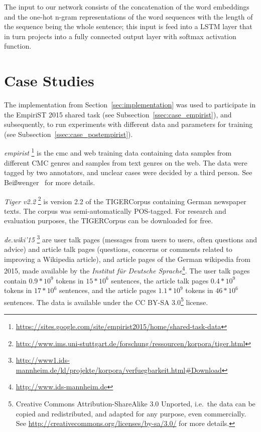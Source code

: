 \documentclass[11pt]{article}
\begin{document}
The input to our network consists of the concatenation of the word embeddings and the one-hot n-gram representations of the word sequences with the length of the sequence being the whole sentence; this input is feed into a LSTM layer that in turn projects into a fully connected output layer with softmax activation function. 

\section{Case Studies}
\label{sec:casestudies}

The implementation from Section~\ref{sec:implementation} was used to participate in the EmpiriST 2015 shared task (see Subsection~\ref{ssec:case_empirist}), and subsequently, to run experiments with different data and parameters for training (see Subsection~\ref{ssec:case_postempirist}).

\emph{empirist}%
\footnote{\url{https://sites.google.com/site/empirist2015/home/shared-task-data}}
is the cmc and web training data containing data samples from different CMC genres and samples from text genres on the web.
The data were tagged by two annotators, and unclear cases were decided by a third person. See Bei{\ss}wenger~ for more details.

\emph{Tiger v2.2}%
\footnote{\url{http://www.ims.uni-stuttgart.de/forschung/ressourcen/korpora/tiger.html}}
is version 2.2 of the TIGERCorpus\cite{Brants2004} containing German newspaper texts. 
The corpus was semi-automatically POS-tagged. For research and evaluation purposes, the TIGERCorpus can be downloaded for free.

\emph{de.wiki'15}%
\footnote{\url{http://www1.ids-mannheim.de/kl/projekte/korpora/verfuegbarkeit.html#Download}}
are user talk pages (messages from users to users, often questions and advice) and article talk pages (questions, concerns or comments related to improving a Wikipedia article), and article pages of the German wikipedia from 2015, made available by the \emph{Institut f\"{u}r Deutsche Sprache}\footnote{\url{http://www.ids-mannheim.de}}.
The user talk pages contain
$0.9*10^9$ tokens in
$15*10^6$ sentences, the article talk pages
$0.4*10^9$ tokens in
$17*10^6$ sentences, and the article pages
$1.1*10^9$
tokens in
$46*10^6$ sentences.
The data is available under the 
CC BY-SA 3.0\footnote{Creative Commons Attribution-ShareAlike 3.0 Unported, i.e.~the data can be copied and redistributed, and adapted for any purpose, even commercially. See \url{http://creativecommons.org/licenses/by-sa/3.0/} for more details.} license.
\end{document}
